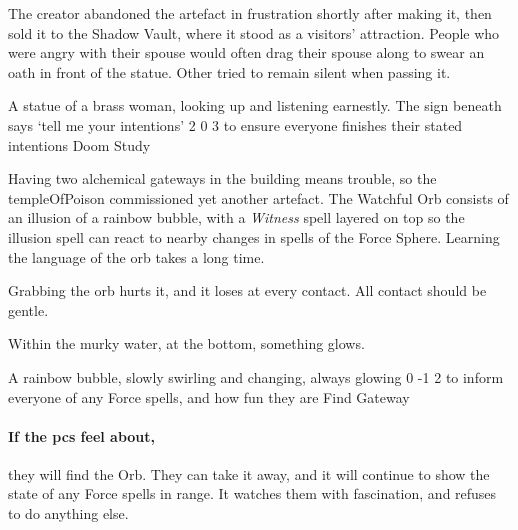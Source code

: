 \begin{multicols}{2}
\begin{exampletext}
  The creator abandoned the \gls{artefact} in frustration shortly after making it, then sold it to the Shadow Vault, where it stood as a visitors' attraction.
  People who were angry with their spouse would often drag their spouse along to swear an oath in front of the statue.
  Other tried to remain silent when passing it.
\end{exampletext}

  {A statue of a brass woman, looking up and listening earnestly.
  The sign beneath says `tell me your intentions'}%
  {2}%
  {0}%
  {3}%
  {to ensure everyone finishes their stated intentions}%
  {Doom Study}%
  {
    \setcounter{Fate}{2}
    \setcounter{Water}{2}
    \setcounter{Empathy}{2}
    \setcounter{Wyldcrafting}{1}
  }%

\showStdSpells[
  \setcounter{diceNo}{0}
]


\begin{exampletext}
  Having two alchemical gateways in the building means trouble, so the \gls{templeOfPoison} commissioned yet another \gls{artefact}.
  The Watchful Orb consists of an illusion of a rainbow bubble, with a \textit{Witness} spell layered on top so the illusion spell can react to nearby changes in spells of the Force Sphere.
  Learning the language of the orb takes a long time.

  Grabbing the orb hurts it, and it loses  at every contact.
  All contact should be gentle.
\end{exampletext}

\begin{boxtext}
  Within the murky water, at the bottom, something glows.
\end{boxtext}

  {A rainbow bubble, slowly swirling and changing, always glowing}%
  {0}%
  {-1}%
  {2}%
  {to inform everyone of any Force spells, and how fun they are}%
  {Find Gateway}%
  {
    \setcounter{Air}{3}
    \setcounter{Fire}{3}
    \setcounter{Earth}{1}
    \setcounter{Academics}{2}
    \setcounter{Xenomology}{2}
  }%

\showStdSpells[
  \setcounter{enc}{2}
  \findGatewaySpell
]

\paragraph{If the \glspl{pc} feel about,}
they will find the Orb.
They can take it away, and it will continue to show the state of any Force spells in range.
It watches them with fascination, and refuses to do anything else.


\end{multicols}
